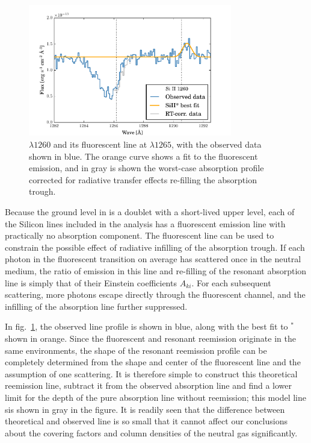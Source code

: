 \documentclass[twocolumn]{aastex61}
\begin{document}
\begin{figure}
\centering
\includegraphics[width=3.500in]{../Figs/1260-fit-fluor.pdf}
\caption{ $\lambda 1260$ and its fluorescent line at
$\lambda 1265$, with the observed data shown in blue. The orange curve
shows a fit to the fluorescent emission, and in gray is shown the
worst-case absorption profile corrected for radiative transfer effects
re-filling the absorption trough.}\label{fig:rt}
\end{figure}

Because the ground level in  is a doublet with a short-lived
upper level, each of the Silicon lines included in the analysis has a
fluorescent emission line with practically no absorption component. The
fluorescent line can be used to constrain the possible effect of
radiative infilling of the absorption trough. If each photon in the
fluorescent transition on average has scattered once in the neutral
medium, the ratio of emission in this line and re-filling of the
resonant absorption line is simply that of their Einstein coefficients
$A_{ki}$. For each subsequent scattering, more photons escape directly
through the fluorescent channel, and the infilling of the absorption
line further suppressed.

In fig.~\ref{fig:rt}, the observed line profile is shown in blue, along
with the best fit to $^*$ shown in orange. Since the
fluorescent and resonant reemission originate in the same environments,
the shape of the resonant reemission profile can be completely
determined from the shape and center of the fluorescent line and the
assumption of one scattering. It is therefore simple to construct this
theoretical reemission line, subtract it from the observed absorption
line and find a lower limit for the depth of the pure absorption line
without reemission; this model line sis shown in gray in the figure. It
is readily seen that the difference between theoretical and observed
line is so small that it cannot affect our conclusions about the
covering factors and column densities of the neutral gas significantly.
\end{document}
